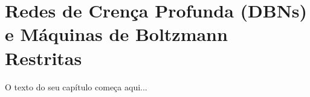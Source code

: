 
\chapter{Redes de Crença Profunda (DBNs) e Máquinas de Boltzmann Restritas}
\label{cap:dbn}

O texto do seu capítulo começa aqui...